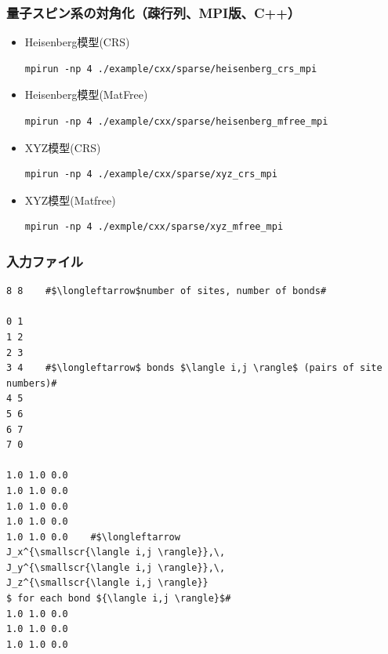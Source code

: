 \begin{frame}[c,fragile]
  \frametitle{量子スピン系の対角化（疎行列、MPI版、C++）}
  \begin{itemize}
  \item Heisenberg模型(CRS) 
\begin{lstlisting}[style=shstyle]
mpirun -np 4 ./example/cxx/sparse/heisenberg_crs_mpi
\end{lstlisting}
  \item Heisenberg模型(MatFree) 
\begin{lstlisting}[style=shstyle]
mpirun -np 4 ./example/cxx/sparse/heisenberg_mfree_mpi
\end{lstlisting}
  \item XYZ模型(CRS) 
\begin{lstlisting}[style=shstyle]
mpirun -np 4 ./example/cxx/sparse/xyz_crs_mpi
\end{lstlisting}
  \item XYZ模型(Matfree) 
\begin{lstlisting}[style=shstyle]
mpirun -np 4 ./exmple/cxx/sparse/xyz_mfree_mpi
\end{lstlisting}
  \end{itemize}
\end{frame}

\lstset{escapechar=\#}

\begin{frame}[c,fragile]
  \frametitle{入力ファイル}
\begin{lstlisting}[style=shstyle]
8 8    #$\longleftarrow$number of sites, number of bonds#

0 1
1 2
2 3
3 4    #$\longleftarrow$ bonds $\langle i,j \rangle$ (pairs of site numbers)#
4 5
5 6
6 7
7 0

1.0 1.0 0.0
1.0 1.0 0.0
1.0 1.0 0.0
1.0 1.0 0.0
1.0 1.0 0.0    #$\longleftarrow
J_x^{\smallscr{\langle i,j \rangle}},\, 
J_y^{\smallscr{\langle i,j \rangle}},\,
J_z^{\smallscr{\langle i,j \rangle}}
$ for each bond ${\langle i,j \rangle}$#
1.0 1.0 0.0
1.0 1.0 0.0
1.0 1.0 0.0
\end{lstlisting}
\end{frame}



